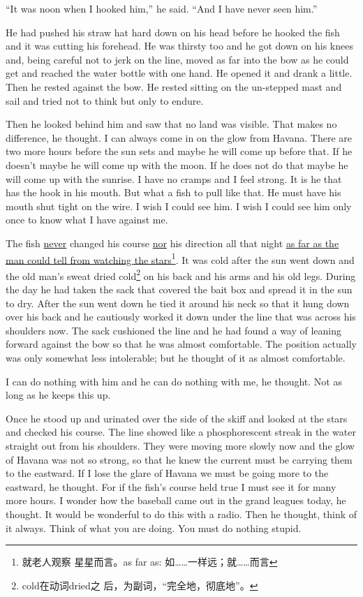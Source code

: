 \documentclass[fontset=ubuntu,zihao=-4]{ctexrep}
\begin{document}
``It was noon when I hooked him,'' he said. ``And I have never seen him.''

He had pushed his \gls{straw} hat hard down on his head before he hooked the fish
and it was cutting his \gls{forehead}. He was \gls{thirsty} too and he got down on
his knees and, being careful not to \gls{jerk} on the line, moved as far
into the bow as he could get and reached the water bottle with one hand. He
opened it and drank a little. Then he rested against the bow. He rested
sitting on the \gls{un-stepped} mast and sail and tried not to think but
only to \gls{endure}.


Then he looked behind him and saw that no land was \gls{visible}. That makes no
difference, he thought. I can always come in on the \gls{glow} from Havana.
There are two more hours before the sun sets and maybe he will come up
before that. If he doesn't maybe he will come up with the moon. If he does
not do that maybe he will come up with the sunrise. I have no \glspl{cramp}
and I feel strong. It is he that has the hook in his mouth. But what a fish
to pull like that. He must have his mouth shut \gls{tight} on the wire. I
wish I could see him. I wish I could see him only once to know what I have
against me.


The fish \uline{never} changed his \gls{course} \uline{nor} his direction all that night
\uline{as far as the man could tell from watching the stars}\footnote{就老人观察
  星星而言。as far as: 如……一样远；就……而言}. It was cold after the sun
went down and the old man's sweat dried cold\footnote{cold在动词dried之
  后，为副词，“完全地，彻底地”。} on his back and his arms and his old
legs. During the day he had taken the sack that covered the bait box and
spread it in the sun to dry. After the sun went down he tied it around his
neck so that it hung down over his back and he \gls{cautiously} worked it
down under the line that was across his shoulders now. The sack
\gls{cushioned} the line and he had found a way of leaning forward against
the bow so that he was almost \gls{comfortable}. The position actually was only
\gls{somewhat} less \gls{intolerable}; but he thought of it as almost comfortable.

I can do nothing with him and he can do nothing with me, he thought. Not as
long as he keeps this up.

Once he stood up and urinated over the side of the skiff and looked at
the stars and checked his course. The line showed like a
\gls{phosphorescent} \gls{streak} in the water straight out from his
shoulders. They were moving more slowly now and the glow of Havana was not
so strong, so that he knew the current must be carrying them to the
\gls{eastward}. If I lose the glare of Havana we must be going more to the
eastward, he thought. For if the fish's course held true I must see it for
many more hours. I wonder how the baseball came out in the grand leagues
today, he thought. It would be wonderful to do this with a radio. Then he
thought, think of it always. Think of what you are doing. You must do
nothing stupid.
\end{document}
